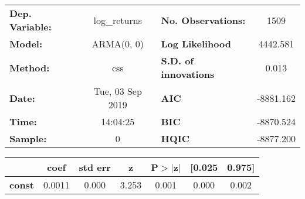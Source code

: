 \begin{center}
\begin{tabular}{lclc}
\toprule
\textbf{Dep. Variable:} &   log\_returns   & \textbf{  No. Observations:  } &    1509     \\
\textbf{Model:}         &    ARMA(0, 0)    & \textbf{  Log Likelihood     } &  4442.581   \\
\textbf{Method:}        &       css        & \textbf{  S.D. of innovations} &   0.013     \\
\textbf{Date:}          & Tue, 03 Sep 2019 & \textbf{  AIC                } & -8881.162   \\
\textbf{Time:}          &     14:04:25     & \textbf{  BIC                } & -8870.524   \\
\textbf{Sample:}        &        0         & \textbf{  HQIC               } & -8877.200   \\
\bottomrule
\end{tabular}
\begin{tabular}{lcccccc}
               & \textbf{coef} & \textbf{std err} & \textbf{z} & \textbf{P$> |$z$|$} & \textbf{[0.025} & \textbf{0.975]}  \\
\midrule
\textbf{const} &       0.0011  &        0.000     &     3.253  &         0.001        &        0.000    &        0.002     \\
\bottomrule
\end{tabular}
\end{center}
